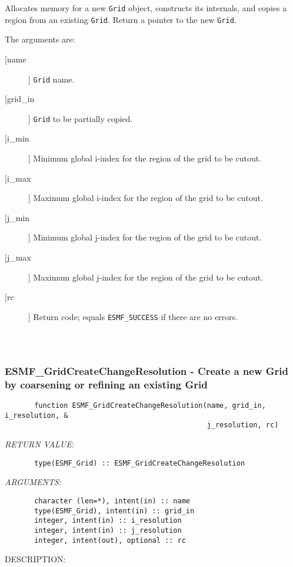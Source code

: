 {       Allocates memory for a new {\tt Grid} object, constructs its
       internals, and copies a region from an existing {\tt Grid}.
       Return a pointer to the new {\tt Grid}.
  
       The arguments are:
       \begin{description}
       \item[[name]] 
            {\tt Grid} name.
       \item[[grid\_in]] 
            {\tt Grid} to be partially copied.
       \item[[i\_min]] 
            Minimum global i-index for the region of the grid to be cutout.
       \item[[i\_max]] 
            Maximum global i-index for the region of the grid to be cutout.
       \item[[j\_min]] 
            Minimum global j-index for the region of the grid to be cutout.
       \item[[j\_max]] 
            Maximum global j-index for the region of the grid to be cutout.
       \item[[rc]] 
            Return code; equals {\tt ESMF\_SUCCESS} if there are no errors.
     \end{description}
  
\begin{verbatim} \end{verbatim}
 
 
\mbox{}\hrulefill\ 
 
\subsubsection{ESMF\_GridCreateChangeResolution - Create a new Grid by coarsening or refining an existing Grid}


\begin{verbatim}       function ESMF_GridCreateChangeResolution(name, grid_in, i_resolution, &
                                                j_resolution, rc)\end{verbatim}{\em RETURN VALUE:}
\begin{verbatim}       type(ESMF_Grid) :: ESMF_GridCreateChangeResolution\end{verbatim}{\em ARGUMENTS:}
\begin{verbatim}       character (len=*), intent(in) :: name
       type(ESMF_Grid), intent(in) :: grid_in
       integer, intent(in) :: i_resolution
       integer, intent(in) :: j_resolution
       integer, intent(out), optional :: rc\end{verbatim}
{\sf DESCRIPTION:\\ }


}
